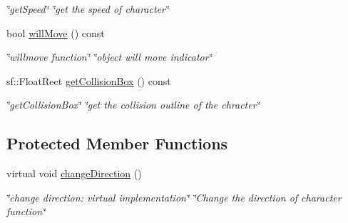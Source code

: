 \begin{DoxyCompactItemize}
\begin{DoxyCompactList}\small\item\em \char`\"{}get\+Speed\char`\"{}  \char`\"{}get the speed of character\char`\"{} \end{DoxyCompactList}\item 
bool \hyperlink{classCharacter_a53d02c2b1c914990e51e0fb84913d151}{will\+Move} () const
\begin{DoxyCompactList}\small\item\em \char`\"{}willmove function\char`\"{}  \char`\"{}object will move indicator\char`\"{} \end{DoxyCompactList}\item 
sf\+::\+Float\+Rect \hyperlink{classCharacter_af12a30a3a299cafe423d1554624c4c3f}{get\+Collision\+Box} () const
\begin{DoxyCompactList}\small\item\em \char`\"{}get\+Collision\+Box\char`\"{}  \char`\"{}get the collision outline of the chracter\char`\"{} \end{DoxyCompactList}\end{DoxyCompactItemize}
\subsection*{Protected Member Functions}
\begin{DoxyCompactItemize}
\item 
\mbox{\label{classCharacter_ab4c0dc6f72c78607b921cf312e10ed35}} 
virtual void \hyperlink{classCharacter_ab4c0dc6f72c78607b921cf312e10ed35}{change\+Direction} ()
\begin{DoxyCompactList}\small\item\em \char`\"{}change direction\+: virtual implementation\char`\"{}  \char`\"{}\+Change the direction of character function\char`\"{} \end{DoxyCompactList}\end{DoxyCompactItemize}

